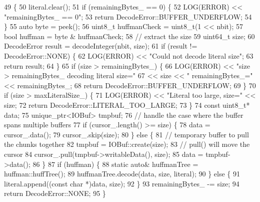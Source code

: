 \begin{DoxyCode}
49                                                                      \{
50   literal.clear();
51   \textcolor{keywordflow}{if} (remainingBytes_ == 0) \{
52     LOG(ERROR) << \textcolor{stringliteral}{"remainingBytes\_ == 0"};
53     \textcolor{keywordflow}{return} DecodeError::BUFFER\_UNDERFLOW;
54   \}
55   \textcolor{keyword}{auto} byte = peek();
56   uint8\_t huffmanCheck = uint8\_t(1 << nbit);
57   \textcolor{keywordtype}{bool} huffman = byte & huffmanCheck;
58   \textcolor{comment}{// extract the size}
59   uint64\_t size;
60   DecodeError result = decodeInteger(nbit, size);
61   \textcolor{keywordflow}{if} (result != DecodeError::NONE) \{
62     LOG(ERROR) << \textcolor{stringliteral}{"Could not decode literal size"};
63     \textcolor{keywordflow}{return} result;
64   \}
65   \textcolor{keywordflow}{if} (size > remainingBytes_) \{
66     LOG(ERROR) << \textcolor{stringliteral}{"size > remainingBytes\_ decoding literal size="}
67                << size << \textcolor{stringliteral}{" remainingBytes\_="} << remainingBytes_;
68     \textcolor{keywordflow}{return} DecodeError::BUFFER\_UNDERFLOW;
69   \}
70   \textcolor{keywordflow}{if} (size > maxLiteralSize_) \{
71     LOG(ERROR) << \textcolor{stringliteral}{"Literal too large, size="} << size;
72     \textcolor{keywordflow}{return} DecodeError::LITERAL\_TOO\_LARGE;
73   \}
74   \textcolor{keyword}{const} uint8\_t* data;
75   unique\_ptr<IOBuf> tmpbuf;
76   \textcolor{comment}{// handle the case where the buffer spans multiple buffers}
77   \textcolor{keywordflow}{if} (cursor_.length() >= size) \{
78     data = cursor_.data();
79     cursor_.skip(size);
80   \} \textcolor{keywordflow}{else} \{
81     \textcolor{comment}{// temporary buffer to pull the chunks together}
82     tmpbuf = IOBuf::create(size);
83     \textcolor{comment}{// pull() will move the cursor}
84     cursor_.pull(tmpbuf->writableData(), size);
85     data = tmpbuf->data();
86   \}
87   \textcolor{keywordflow}{if} (huffman) \{
88     \textcolor{keyword}{static} \textcolor{keyword}{auto}& huffmanTree = huffman::huffTree();
89     huffmanTree.decode(data, size, literal);
90   \} \textcolor{keywordflow}{else} \{
91     literal.append((\textcolor{keyword}{const} \textcolor{keywordtype}{char} *)data, size);
92   \}
93   remainingBytes_ -= size;
94   \textcolor{keywordflow}{return} DecodeError::NONE;
95 \}
\end{DoxyCode}
